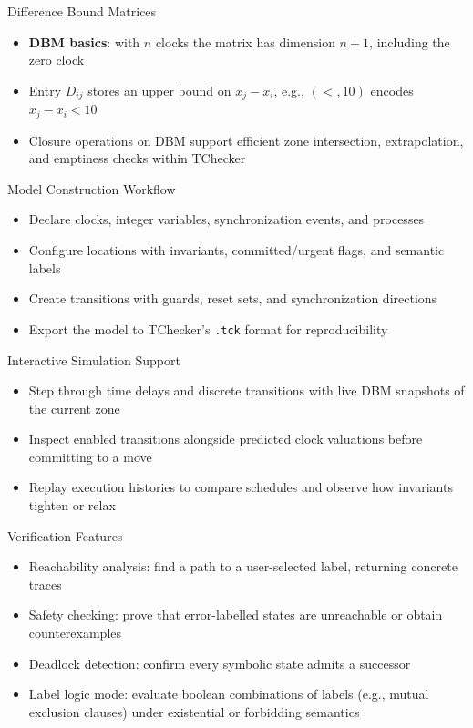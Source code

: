 \documentclass{beamer}
\begin{document}
\begin{frame}{Difference Bound Matrices}
  \begin{itemize}
    \item \textbf{DBM basics}: with \(n\) clocks the matrix has dimension \(n{+}1\), including the zero clock
    \item Entry \(D_{ij}\) stores an upper bound on \(x_j - x_i\), e.g., \((<, 10)\) encodes \(x_j - x_i < 10\)
    \item Closure operations on DBM support efficient zone intersection, extrapolation, and emptiness checks within TChecker
  \end{itemize}
\end{frame}

\begin{frame}{Model Construction Workflow}
  \begin{itemize}
    \item Declare clocks, integer variables, synchronization events, and processes
    \item Configure locations with invariants, committed/urgent flags, and semantic labels
    \item Create transitions with guards, reset sets, and synchronization directions
    \item Export the model to TChecker's \texttt{.tck} format for reproducibility
  \end{itemize}
\end{frame}

\begin{frame}{Interactive Simulation Support}
  \begin{itemize}
    \item Step through time delays and discrete transitions with live DBM snapshots of the current zone
    \item Inspect enabled transitions alongside predicted clock valuations before committing to a move
    \item Replay execution histories to compare schedules and observe how invariants tighten or relax
  \end{itemize}
\end{frame}

\begin{frame}{Verification Features}
  \begin{itemize}
    \item Reachability analysis: find a path to a user-selected label, returning concrete traces
    \item Safety checking: prove that error-labelled states are unreachable or obtain counterexamples
    \item Deadlock detection: confirm every symbolic state admits a successor
    \item Label logic mode: evaluate boolean combinations of labels (e.g., mutual exclusion clauses) under existential or forbidding semantics
  \end{itemize}
\end{frame}
\end{document}
